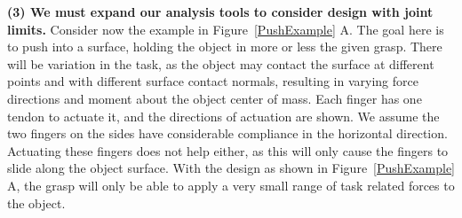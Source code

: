 \smallskip\noindent
{\bf (3) We must expand our analysis tools to consider design with joint limits.}     Consider now the example in Figure~\ref{PushExample} A.     The goal here is to push into a surface, holding the object in more or less the given grasp.   There will be variation in the task, as the object may contact the surface at different points and with different surface contact normals, resulting in varying force directions and moment about the object center of mass.    Each finger has one tendon to actuate it, and the directions of actuation are shown.    We assume the two fingers on the sides have considerable compliance in the horizontal direction.   Actuating these fingers does not help either, as this will only cause the fingers to slide along the object surface.    With the design as shown in Figure~\ref{PushExample} A, the grasp will only be able to apply a very small range of task related forces to the object.

